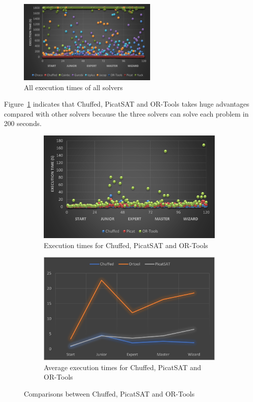 \begin{figure}[H]
    \centering
    \includegraphics[width=0.6\textwidth]{figs/all_point_IQtwist.png}
    \caption{All execution times of all solvers}
    \label{fig:execution times}
\end{figure}
Figure~\ref{fig:execution times} indicates that Chuffed, PicatSAT and OR-Tools takes huge advantages compared with other solvers because the three solvers can solve each problem in 200 seconds.
\begin{figure}[H]
\centering
\begin{subfigure}[b]{.48\textwidth}
\centering
\includegraphics[width=\textwidth]{figs/threesolverpoints.png}
\caption{Execution times for Chuffed, PicatSAT and OR-Tools}
\label{fig:3solvers1}
\end{subfigure}
\begin{subfigure}[b]{.48\textwidth}
\centering
\includegraphics[width=\textwidth]{figs/Three comparison.png}
\caption{Average execution times for Chuffed, PicatSAT and OR-Tools}
\label{fig:3comparison}
\end{subfigure}
\caption{Comparisons between Chuffed, PicatSAT and OR-Tools}
\label{fig:3comparisonsssss}
\end{figure}

